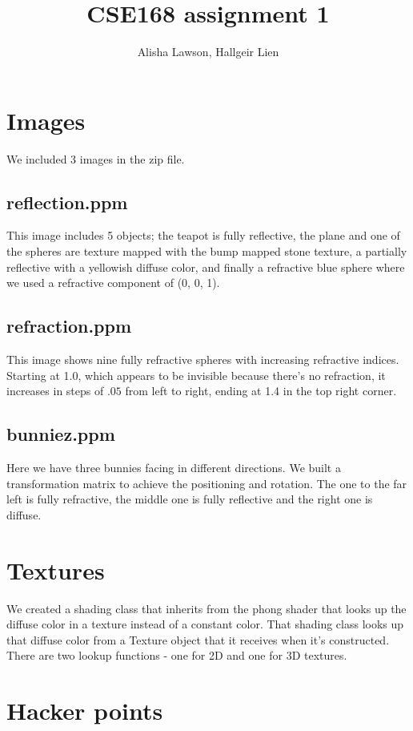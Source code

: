 \documentclass{article} %
\title{CSE168 assignment 1}
\author{Alisha Lawson, Hallgeir Lien}
\date{} %
\begin{document}
\maketitle

\section{Images}
We included 3 images in the zip file.
\subsection{reflection.ppm}
This image includes 5 objects; the teapot is fully reflective, the plane and one of the spheres are texture mapped with the bump mapped stone texture, a partially reflective with a yellowish diffuse color, and finally a refractive blue sphere where we used a refractive component of (0, 0, 1).

\subsection{refraction.ppm}
This image shows nine fully refractive spheres with increasing refractive indices. Starting at 1.0, which appears to be invisible because there's no refraction, it increases in steps of $.05$ from left to right, ending at 1.4 in the top right corner.

\subsection{bunniez.ppm}
Here we have three bunnies facing in different directions. We built a transformation matrix to achieve the positioning and rotation. The one to the far left is fully refractive, the middle one is fully reflective and the right one is diffuse. 

\section{Textures}
We created a shading class that inherits from the phong shader that looks up the diffuse color in a texture instead of a constant color. That shading class looks up that diffuse color from a Texture object that it receives when it's constructed. There are two lookup functions - one for 2D and one for 3D textures.

\section{Hacker points}
\end{document}
